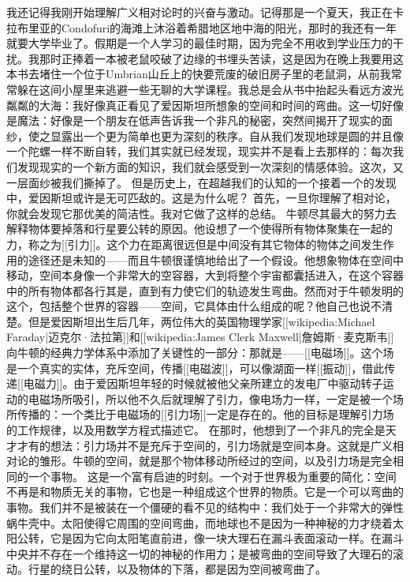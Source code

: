 \documentclass[12pt,a4paper,twoside]{ctexrep}
\begin{document}
    我还记得我刚开始理解广义相对论时的兴奋与激动。记得那是一个夏天，我正在卡拉布里亚的Condofuri的海滩上沐浴着希腊地区地中海的阳光，那时的我还有一年就要大学毕业了。假期是一个人学习的最佳时期，因为完全不用收到学业压力的干扰。我那时正捧着一本被老鼠咬破了边缘的书埋头苦读，这是因为在晚上我要用这本书去堵住一个位于Umbrian山丘上的快要荒废的破旧房子里的老鼠洞，从前我常常躲在这间小屋里来逃避一些无聊的大学课程。我总是会从书中抬起头看远方波光粼粼的大海：我好像真正看见了爱因斯坦所想象的空间和时间的弯曲。这一切好像是魔法：好像是一个朋友在低声告诉我一个非凡的秘密，突然间揭开了现实的面纱，使之显露出一个更为简单也更为深刻的秩序。自从我们发现地球是圆的并且像一个陀螺一样不断自转，我们其实就已经发现，现实并不是看上去那样的：每次我们发现现实的一个新方面的知识，我们就会感受到一次深刻的情感体验。这次，又一层面纱被我们撕掉了。
    但是历史上，在超越我们的认知的一个接着一个的发现中，爱因斯坦或许是无可匹敌的。这是为什么呢？
    首先，一旦你理解了相对论，你就会发现它那优美的简洁性。我对它做了这样的总结。
    牛顿尽其最大的努力去解释物体要掉落和行星要公转的原因。他设想了一个使得所有物体聚集在一起的力，称之为[[引力]]。这个力在距离很远但是中间没有其它物体的物体之间发生作用的途径还是未知的——而且牛顿很谨慎地给出了一个假设。他想象物体在空间中移动，空间本身像一个非常大的空容器，大到将整个宇宙都囊括进入，在这个容器中的所有物体都各行其是，直到有力使它们的轨迹发生弯曲。然而对于牛顿发明的这个，包括整个世界的容器——空间，它具体由什么组成的呢？他自己也说不清楚。但是爱因斯坦出生后几年，两位伟大的英国物理学家[[wikipedia:Michael Faraday|迈克尔·法拉第]]和[[wikipedia:James Clerk Maxwell|詹姆斯·麦克斯韦]]向牛顿的经典力学体系中添加了关键性的一部分：那就是——[[电磁场]]。这个场是一个真实的实体，充斥空间，传播[[电磁波]]，可以像湖面一样[[振动]]，借此传递[[电磁力]]。由于爱因斯坦年轻的时候就被他父亲所建立的发电厂中驱动转子运动的电磁场所吸引，所以他不久后就理解了引力，像电场力一样，一定是被一个场所传播的：一个类比于电磁场的[[引力场]]一定是存在的。他的目标是理解引力场的工作规律，以及用数学方程式描述它。
    在那时，他想到了一个非凡的完全是天才才有的想法：引力场并不是充斥于空间的，引力场就是空间本身。这就是广义相对论的雏形。牛顿的空间，就是那个物体移动所经过的空间，以及引力场是完全相同的一个事物。
    这是一个富有启迪的时刻。一个对于世界极为重要的简化：空间不再是和物质无关的事物，它也是一种组成这个世界的物质。它是一个可以弯曲的事物。我们并不是被装在一个僵硬的看不见的结构中：我们处于一个非常大的弹性蜗牛壳中。太阳使得它周围的空间弯曲，而地球也不是因为一种神秘的力才绕着太阳公转，它是因为它向太阳笔直前进，像一块大理石在漏斗表面滚动一样。在漏斗中央并不存在一个维持这一切的神秘的作用力；是被弯曲的空间导致了大理石的滚动。行星的绕日公转，以及物体的下落，都是因为空间被弯曲了。
\end{document}
